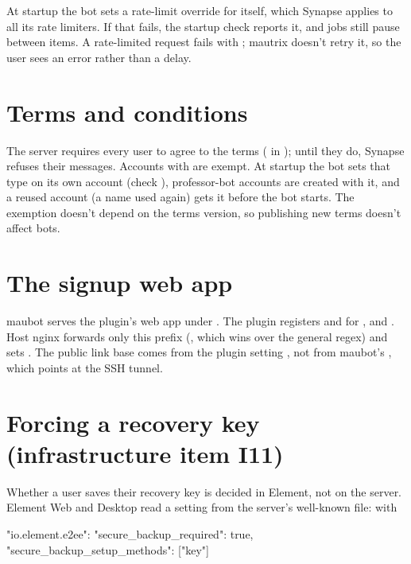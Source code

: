 At startup the bot sets a rate-limit override for itself, which Synapse applies to all its
rate limiters. If that fails, the startup check  reports it, and jobs still
pause  between items. A rate-limited request fails with ; mautrix doesn't retry it, so the user sees an error rather than a delay.

\section{Terms and conditions}

The server requires every user to agree to the terms ( in
); until they do, Synapse refuses their messages. Accounts with
 are exempt. At startup the bot sets that type on its own account (check
), professor-bot accounts are created with it, and a reused account (a name
used again) gets it before the bot starts. The exemption doesn't depend on the terms
version, so publishing new terms doesn't affect bots.

\section{The signup web app}

maubot serves the plugin's web app under . The
plugin registers  and  for ,  and
. Host nginx
forwards only this prefix (, which wins over the general 
regex) and sets . The public link base comes from the plugin setting
, not from maubot's , which points at the SSH
tunnel.

\section{Forcing a recovery key (infrastructure item I11)}

Whether a user saves their recovery key is decided in Element, not on the server. Element
Web and Desktop read a setting from the server's well-known file: with

\begin{codefile}
"io.element.e2ee": {
  "secure_backup_required": true,
  "secure_backup_setup_methods": ["key"]
}
\end{codefile}


